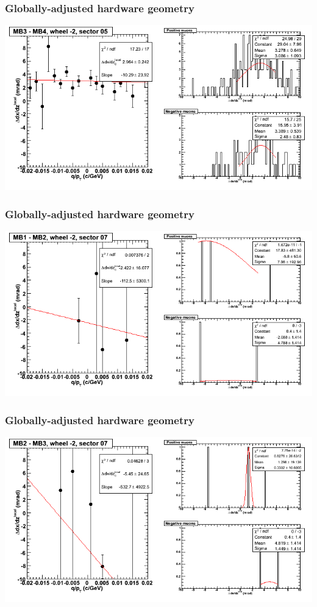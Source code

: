 \documentclass[compress]{beamer}
\begin{document}
\begin{frame}
\frametitle{Globally-adjusted hardware geometry}
\includegraphics[width=\linewidth]{NOV4_segdiffs_HW/dt13_slope_A_05_34.png}
\end{frame}

\begin{frame}
\frametitle{Globally-adjusted hardware geometry}
\includegraphics[width=\linewidth]{NOV4_segdiffs_HW/dt13_slope_A_07_12.png}
\end{frame}

\begin{frame}
\frametitle{Globally-adjusted hardware geometry}
\includegraphics[width=\linewidth]{NOV4_segdiffs_HW/dt13_slope_A_07_23.png}
\end{frame}
\end{document}
